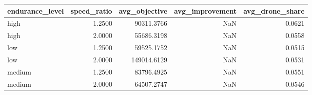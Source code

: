 \begin{tabular}{lrrrr}
\toprule
endurance_level & speed_ratio & avg_objective & avg_improvement & avg_drone_share \\
\midrule
high & 1.2500 & 90311.3766 & NaN & 0.0621 \\
high & 2.0000 & 55686.3198 & NaN & 0.0558 \\
low & 1.2500 & 59525.1752 & NaN & 0.0515 \\
low & 2.0000 & 149014.6129 & NaN & 0.0531 \\
medium & 1.2500 & 83796.4925 & NaN & 0.0551 \\
medium & 2.0000 & 64507.2747 & NaN & 0.0546 \\
\bottomrule
\end{tabular}
